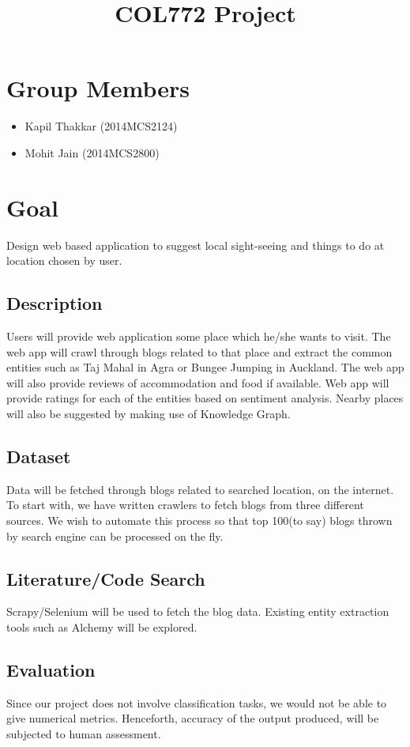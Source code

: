 \documentclass{article}
\title{COL772 Project}
\begin{document}
\date{}
\maketitle
\section{Group Members}

\begin{itemize}
\item Kapil Thakkar (2014MCS2124)
\item Mohit Jain (2014MCS2800)
\end{itemize}


\section{Goal}

Design web based application to suggest local sight-seeing and things to do at location chosen by user.

\subsection{Description}

Users will provide web application some place which he/she wants to visit. The web app will crawl through blogs related to that place and extract the common entities such as Taj Mahal in Agra or Bungee Jumping in Auckland. The web app will also provide reviews of accommodation and food if available. Web app will provide ratings for each of the entities based on sentiment analysis. Nearby places will also be suggested by making use of Knowledge Graph.

\subsection{Dataset}

Data will be fetched through blogs related to searched location, on the internet. To start with, we have written crawlers to fetch blogs from three different sources. We wish to automate this process so that top 100(to say) blogs thrown by search engine can be processed on the fly.

\subsection{Literature/Code Search}

Scrapy/Selenium will be used to fetch the blog data. Existing entity extraction tools such as Alchemy will be explored.

\subsection{Evaluation}

Since our project does not involve classification tasks, we would not be able to give numerical metrics. Henceforth, accuracy of the output produced, will be subjected to human assessment.   
\end{document}

